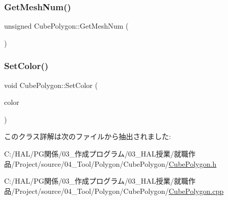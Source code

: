 \subsubsection{\texorpdfstring{Get\+Mesh\+Num()}{GetMeshNum()}}
{\footnotesize\ttfamily unsigned Cube\+Polygon\+::\+Get\+Mesh\+Num (\begin{DoxyParamCaption}{ }\end{DoxyParamCaption})\hspace{0.3cm}{\ttfamily [inline]}}

\mbox{\label{class_cube_polygon_acf6a30c30c22dd887ed570db6cbe285d}} 
\subsubsection{\texorpdfstring{Set\+Color()}{SetColor()}}
{\footnotesize\ttfamily void Cube\+Polygon\+::\+Set\+Color (\begin{DoxyParamCaption}\item[{\mbox{\hyperlink{_vector3_d_8h_a680c30c4a07d86fe763c7e01169cd6cc}{X\+Color4}}}]{color }\end{DoxyParamCaption})}



このクラス詳解は次のファイルから抽出されました\+:\begin{DoxyCompactItemize}
\item 
C\+:/\+H\+A\+L/\+P\+G関係/03\+\_\+作成プログラム/03\+\_\+\+H\+A\+L授業/就職作品/\+Project/source/04\+\_\+\+Tool/\+Polygon/\+Cube\+Polygon/\mbox{\hyperlink{_cube_polygon_8h}{Cube\+Polygon.\+h}}\item 
C\+:/\+H\+A\+L/\+P\+G関係/03\+\_\+作成プログラム/03\+\_\+\+H\+A\+L授業/就職作品/\+Project/source/04\+\_\+\+Tool/\+Polygon/\+Cube\+Polygon/\mbox{\hyperlink{_cube_polygon_8cpp}{Cube\+Polygon.\+cpp}}\end{DoxyCompactItemize}
